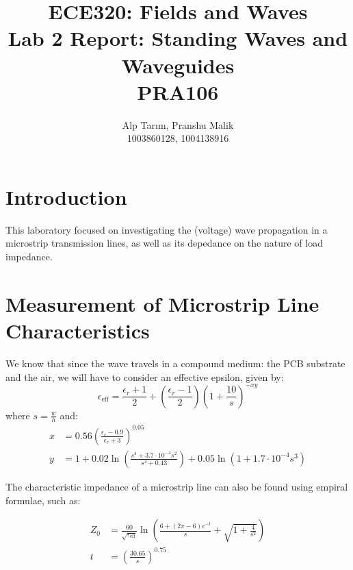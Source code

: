 \documentclass[10pt]{article}
\date{}
\begin{document}
\title{\textbf{\Large{\textsc{ECE320:} Fields and Waves}} \\ \Large{Lab 2 Report: Standing Waves and Waveguides} \\ \textbf{\small{PRA106}}\vspace{-0.3cm}}
\author{Alp Tarım, Pranshu Malik \\ \footnotesize{1003860128}, \footnotesize{1004138916}}

\maketitle

\section{Introduction}

This laboratory focused on investigating the (voltage) wave propagation in a microstrip transmission lines, 
as well as its depedance on the nature of load impedance.

\section{Measurement of Microstrip Line Characteristics}

We know that since the wave travels in a compound medium: the PCB substrate and the air, we will have 
to consider an effective epsilon, given by:
\[
    \epsilon_{\text{eff}} = \frac{\epsilon_r+1}{2}+\left(\frac{\epsilon_r-1}{2}\right)\left(1+\frac{10}{s}\right)^{-xy}
\]
where $s = \frac{w}{h}$ and:
\begin{align*}
    x &= 0.56\left(\frac{\epsilon_r-0.9}{\epsilon_r+3}\right)^{0.05}\\
    y &= 1 + 0.02\ln{\left(\frac{s^4+3.7\cdot10^{-4}s^2}{s^4 + 0.43}\right)} + 0.05\ln{\left(1 + 1.7\cdot10^{-4}s^3\right)}
\end{align*}

The characteristic impedance of a microstrip line can also be found using empiral formulae, such as:

\begin{align*}
    Z_0 &= \frac{60}{\sqrt{\epsilon_{\text{eff}}}}\ln{\left(\frac{6 + (2\pi - 6)e^{-t}}{s} + \sqrt{1 + \frac{4}{s^2}}\right)}\\
    t &= \left(\frac{30.65}{s}\right)^{0.75}
\end{align*}
\end{document}
